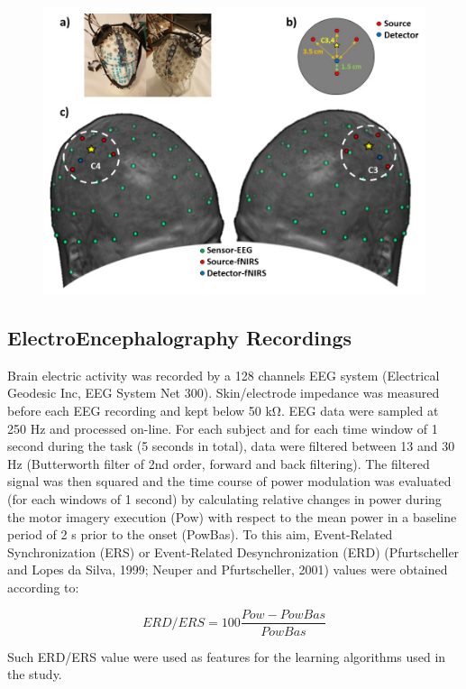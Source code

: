 \documentclass[12pt ]{iopart}
\begin{document}
\begin{figure}
	\includegraphics[width=\linewidth]{Diapositiva1.JPG}
	\caption{}
	\label{fig:fig1}
\end{figure}

\subsection{ElectroEncephalography Recordings}
Brain electric activity was recorded by a 128 channels EEG system (Electrical Geodesic Inc, EEG System Net 300).
Skin/electrode impedance was measured before each EEG recording and kept below 50 kΩ. EEG data were sampled at 250 Hz and processed on-line. For each subject and for each time window of 1 second during the task (5 seconds in total), data were filtered between 13 and 30 Hz (Butterworth filter of 2nd order, forward and back filtering). The filtered signal was then squared
and the time course of power modulation was evaluated (for each windows of 1 second) by calculating relative changes in power during the motor imagery execution (Pow) with respect to the mean power in a baseline period of 2 s prior to the onset (PowBas). To this aim, Event-Related Synchronization (ERS) or Event-Related Desynchronization (ERD) (Pfurtscheller and Lopes da Silva, 1999; Neuper and Pfurtscheller, 2001) values were obtained according to:

\begin{equation}
\label{eqn:erders}
ERD/ERS=100\frac{Pow-PowBas}{PowBas}
\end{equation} 

Such ERD/ERS value were used as features for the learning algorithms used in the study. 
 
\end{document}
